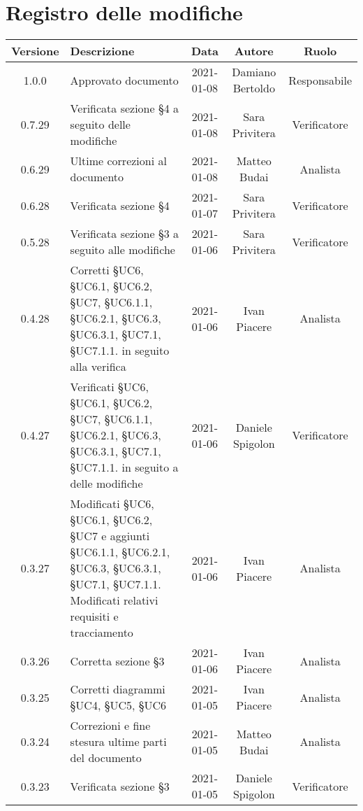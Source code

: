 \section*{Registro delle modifiche}

\begin{center}
	\begin{longtable}{|c|p{5cm}|c|c|c|}
		\hline
		\rowcolor{lighter-grayer}
		\textbf{Versione} & \textbf{Descrizione} & \textbf{Data} & \textbf{Autore} & \textbf{Ruolo} \\
		\hline
		\endfirsthead
		
		1.0.0 & Approvato documento & 2021-01-08 & Damiano Bertoldo & Responsabile \\
		\hline
		0.7.29 & Verificata sezione §4 a seguito delle modifiche & 2021-01-08 & Sara Privitera & Verificatore \\
		\hline
		0.6.29 & Ultime correzioni al documento & 2021-01-08 & Matteo Budai & Analista \\
		\hline
		0.6.28 & Verificata sezione §4 & 2021-01-07 & Sara Privitera & Verificatore \\
		\hline
		0.5.28 & Verificata sezione §3 a seguito alle modifiche & 2021-01-06 & Sara Privitera & Verificatore \\
		\hline
		0.4.28 & Corretti §UC6, §UC6.1, §UC6.2, §UC7, §UC6.1.1, §UC6.2.1, §UC6.3, §UC6.3.1, §UC7.1, §UC7.1.1. in seguito alla verifica & 2021-01-06 & Ivan Piacere & Analista \\
		\hline
		0.4.27 & Verificati §UC6, §UC6.1, §UC6.2, §UC7, §UC6.1.1, §UC6.2.1, §UC6.3, §UC6.3.1, §UC7.1, §UC7.1.1. in seguito a delle modifiche & 2021-01-06 & Daniele Spigolon & Verificatore \\
		\hline
		0.3.27 & Modificati §UC6, §UC6.1, §UC6.2, §UC7 e aggiunti §UC6.1.1, §UC6.2.1, §UC6.3, §UC6.3.1, §UC7.1, §UC7.1.1. Modificati relativi requisiti e tracciamento & 2021-01-06 & Ivan Piacere & Analista \\
		\hline
		0.3.26 & Corretta sezione §3 & 2021-01-06 & Ivan Piacere & Analista \\
		\hline
		0.3.25 & Corretti diagrammi §UC4, §UC5, §UC6 & 2021-01-05 & Ivan Piacere & Analista \\
		\hline
		0.3.24 & Correzioni e fine stesura ultime parti del documento & 2021-01-05 & Matteo Budai & Analista \\
		\hline
		0.3.23 & Verificata sezione §3 & 2021-01-05 & Daniele Spigolon & Verificatore \\

\end{longtable}
\end{center}
